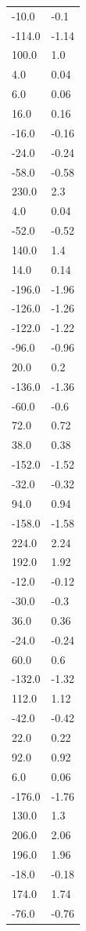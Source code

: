 \begin{longtable}{ll}
-10.0 & -0.1 \\
-114.0 & -1.14 \\
100.0 & 1.0 \\
4.0 & 0.04 \\
6.0 & 0.06 \\
16.0 & 0.16 \\
-16.0 & -0.16 \\
-24.0 & -0.24 \\
-58.0 & -0.58 \\
230.0 & 2.3 \\
4.0 & 0.04 \\
-52.0 & -0.52 \\
140.0 & 1.4 \\
14.0 & 0.14 \\
-196.0 & -1.96 \\
-126.0 & -1.26 \\
-122.0 & -1.22 \\
-96.0 & -0.96 \\
20.0 & 0.2 \\
-136.0 & -1.36 \\
-60.0 & -0.6 \\
72.0 & 0.72 \\
38.0 & 0.38 \\
-152.0 & -1.52 \\
-32.0 & -0.32 \\
94.0 & 0.94 \\
-158.0 & -1.58 \\
224.0 & 2.24 \\
192.0 & 1.92 \\
-12.0 & -0.12 \\
-30.0 & -0.3 \\
36.0 & 0.36 \\
-24.0 & -0.24 \\
60.0 & 0.6 \\
-132.0 & -1.32 \\
112.0 & 1.12 \\
-42.0 & -0.42 \\
22.0 & 0.22 \\
92.0 & 0.92 \\
6.0 & 0.06 \\
-176.0 & -1.76 \\
130.0 & 1.3 \\
206.0 & 2.06 \\
196.0 & 1.96 \\
-18.0 & -0.18 \\
174.0 & 1.74 \\
-76.0 & -0.76 \\

\end{longtable}
